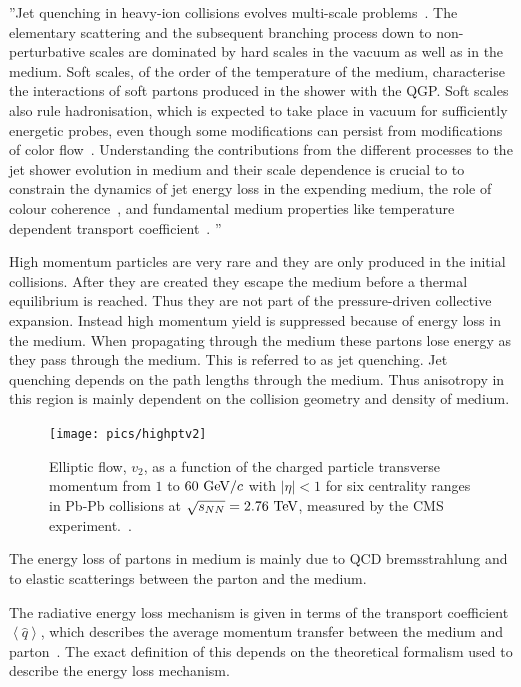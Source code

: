 ''Jet quenching in heavy-ion collisions evolves multi-scale problems~\cite{Kurkela:2014tla,Tachibana:2018yae}. The elementary scattering and the subsequent branching process down to non-perturbative scales are dominated by hard scales in the vacuum as well as in the medium. Soft scales, of the order of the temperature of the medium, characterise the interactions of soft partons produced in the shower with the QGP. Soft scales also rule hadronisation, which is expected to take place in vacuum for sufficiently energetic probes, even though some modifications can persist from modifications of color flow~\cite{Aurenche:2011rd,Beraudo:2011bh,Beraudo:2012bq}. Understanding the contributions from the different processes to the jet shower evolution in medium and their scale dependence is crucial to to constrain the dynamics of jet energy loss in the expending medium, the role of colour coherence~\cite{CasalderreySolana:2012ef}, and fundamental medium properties like temperature dependent transport coefficient~\cite{DEramo:2012uzl,Ayala:2016pvm}.
''


High momentum particles are very rare and they are only produced in the initial collisions. After they are created they escape the medium before a thermal equilibrium is reached. Thus they are not part of the pressure-driven collective expansion. Instead high momentum yield is suppressed because of energy loss in the medium. When propagating through the medium these partons lose energy as they pass through the medium. This is referred to as jet quenching. Jet quenching depends on the path lengths through the medium. Thus anisotropy in this region is mainly dependent on the collision geometry and density of medium.

\begin{figure}
\centering
\texttt{[image: pics/highptv2]}
\caption[Elliptic flow, $v_2$ from $\pt{}=1$ to $60\gevc$]{ Elliptic flow, $v_2$, as a function of the charged particle transverse momentum from $1$ to $60\gevc$ with $\left|\eta\right|<1$ for six centrality ranges in Pb-Pb collisions at $\sqrt{s_{NN}}=2.76\mbox{~TeV}$, measured by the CMS experiment.~\cite{Chatrchyan:2012xq}. }
\label{fig:highpt}
\end{figure}


The energy loss of partons in medium is mainly due to QCD bremsstrahlung and to elastic scatterings between the parton and the medium. 


The radiative energy loss mechanism is given in terms of the transport coefficient $\left<\hat q\right>$, which describes the average momentum transfer between the medium and parton~\cite{jetBroadeningPpb1}. The exact definition of this depends on the theoretical formalism used to describe the energy loss mechanism. 


